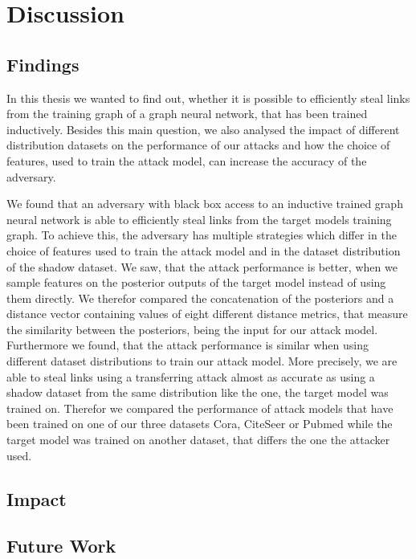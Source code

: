 \chapter{Discussion}

    \section{Findings}
        In this thesis we wanted to find out, whether it is possible to efficiently steal links from the training graph of a graph neural network, that has been trained inductively.
        Besides this main question, we also analysed the impact of different distribution datasets on the performance of our attacks and how the choice of features, used to train the attack model, can increase the accuracy of the adversary.

        We found that an adversary with black box access to an inductive trained graph neural network is able to efficiently steal links from the target models training graph.
        To achieve this, the adversary has multiple strategies which differ in the choice of features used to train the attack model and in the dataset distribution of the shadow dataset.
        We saw, that the attack performance is better, when we sample features on the posterior outputs of the target model instead of using them directly.
        We therefor compared the concatenation of the posteriors and a distance vector containing values of eight different distance metrics, that measure the similarity between the posteriors, being the input for our attack model.
        Furthermore we found, that the attack performance is similar when using different dataset distributions to train our attack model.
        More precisely, we are able to steal links using a transferring attack almost as accurate as using a shadow dataset from the same distribution like the one, the target model was trained on.
        Therefor we compared the performance of attack models that have been trained on one of our three datasets Cora, CiteSeer or Pubmed while the target model was trained on another dataset, that differs the one the attacker used.

    \section{Impact}


    \section{Future Work}
